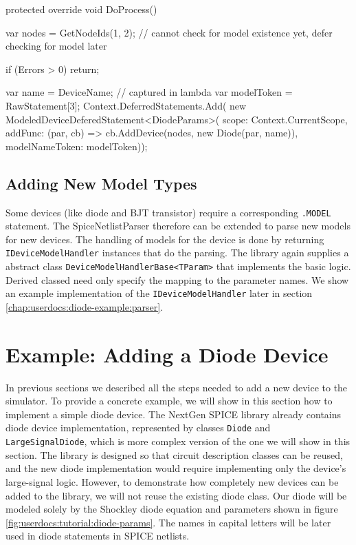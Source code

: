 \begin{csharpcode}
protected override void DoProcess()
{
	var nodes = GetNodeIds(1, 2);
	// cannot check for model existence yet, defer checking for model later
	
	if (Errors > 0)	return;
	
	var name = DeviceName; // captured in lambda
	var modelToken = RawStatement[3];
	Context.DeferredStatements.Add(
		new ModeledDeviceDeferedStatement<DiodeParams>(
			scope: Context.CurrentScope,
			addFunc: (par, cb) => cb.AddDevice(nodes, new Diode(par, name)),
			modelNameToken: modelToken));	
}
\end{csharpcode}

\subsection{Adding New Model Types}

Some devices (like diode and BJT transistor) require a corresponding \texttt{.MODEL} statement. The SpiceNetlistParser therefore can be extended to parse new models for new devices. The handling of models for the device is done by returning \texttt{IDeviceModelHandler} instances that do the parsing. The library again supplies a abstract class \texttt{DeviceModelHandlerBase<TParam>} that implements the basic logic. Derived classed need only specify the mapping to the parameter names. We show an example implementation of the \texttt{IDeviceModelHandler} later in section \ref{chap:userdocs:diode-example:parser}.

\section{Example: Adding a Diode Device}
\label{chap:userdocs:diode-tutorial}

In previous sections we described all the steps needed to add a new device to the simulator. To provide a concrete example, we will show in this section how to implement a simple diode device. The NextGen SPICE library already contains diode device implementation, represented by classes \texttt{Diode} and \texttt{LargeSignalDiode}, which is more complex version of the one we will show in this section. The library is designed so that circuit description classes can be reused, and the new diode implementation would require implementing only the device's large-signal logic. However, to demonstrate how completely new devices can be added to the library, we will not reuse the existing diode class. Our diode will be modeled solely by the Shockley diode equation and parameters shown in figure \ref{fig:userdocs:tutorial:diode-params}. The names in capital letters will be later used in diode statements in SPICE netlists. 

